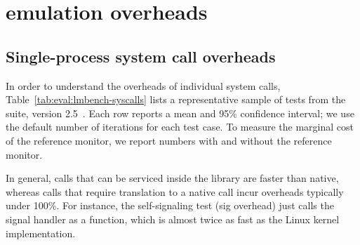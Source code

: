 \section{\Libos{} emulation overheads}


\subsection{Single-process system call overheads}
\label{eval:perf:syscalls}


In order to understand the overheads of individual system calls,
Table~\ref{tab:eval:lmbench-syscalls} lists 
a representative sample of 
tests from the
\lmbench{} suite, version 2.5~\cite{McVoy:lmbench}.
Each row reports a mean and 95\% confidence interval;
we use the default number of iterations for each test case.
To measure the marginal cost of the reference monitor, we report numbers with and without 
the reference monitor.

In general, calls that can be serviced inside the library are faster than native,
whereas calls that require translation to a native call incur overheads typically under 100\%.
For instance, 
the self-signaling test (sig overhead)
just calls the signal handler as a function,
which is almost twice as fast
as the Linux kernel implementation.  

\begin{table}[htp!]

\caption{System call benchmark results based on \lmbench{} 2.5. Comparison is among (1) native Linux processes, (2) \graphene{} \picoprocs{} on Linux host, both without and with JIT-optimized SECCOMP filter ({\bf +SC}) and reference monitor ({\bf +RM}), and (3) \graphene{} in SGX enclaves.
System call latency is in microseconds, and lower is better.
System call bandwidth and throughput are in megabytes per second and operations per second, respectively, and higher is better. 
Overheads are relative to Linux \linuxversion{}; negative overheads indicate improved performance.} 
\label{tab:eval:lmbench-syscalls}
\end{table}






